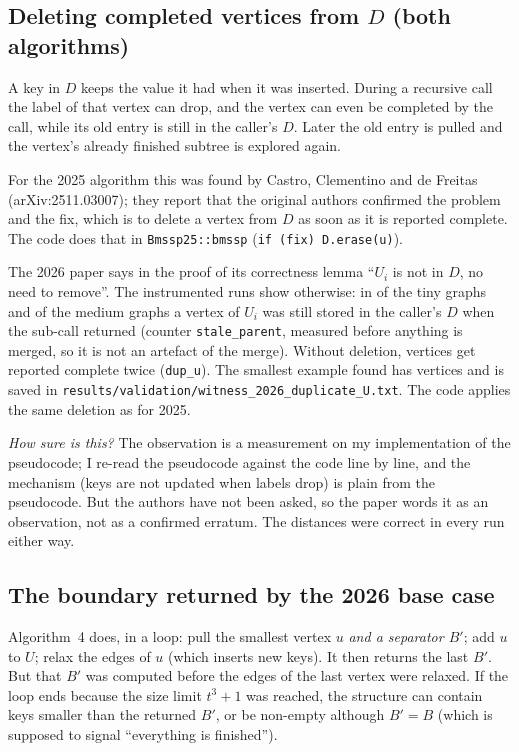 \documentclass[11pt,a4paper]{article}
\newcommand{\code}[1]{\texttt{#1}}
\begin{document}
\subsection{Deleting completed vertices from $D$ (both algorithms)}
A key in $D$ keeps the value it had when it was inserted. During a recursive call the label of that vertex can drop, and the vertex can even be completed by the call, while its old entry is still in the caller's $D$. Later the old entry is pulled and the vertex's already finished subtree is explored again.

For the 2025 algorithm this was found by Castro, Clementino and de Freitas (arXiv:2511.03007); they report that the original authors confirmed the problem and the fix, which is to delete a vertex from $D$ as soon as it is reported complete. The code does that in \code{Bmssp25::bmssp} (\code{if (fix) D.erase(u)}).

The 2026 paper says in the proof of its correctness lemma ``$U_i$ is not in $D$, no need to remove''. The instrumented runs show otherwise: in \ValSmallStaleTwoSix{} of the \ValSmallTrials{} tiny graphs and \ValMediumStaleTwoSix{} of the \ValMediumTrials{} medium graphs a vertex of $U_i$ was still stored in the caller's $D$ when the sub-call returned (counter \code{stale\_parent}, measured before anything is merged, so it is not an artefact of the merge). Without deletion, vertices get reported complete twice (\code{dup\_u}). The smallest example found has \ValMinNDupTwoSix{} vertices and is saved in \code{results/validation/witness\_2026\_duplicate\_U.txt}. The code applies the same deletion as for 2025.

\emph{How sure is this?} The observation is a measurement on my implementation of the pseudocode; I re-read the pseudocode against the code line by line, and the mechanism (keys are not updated when labels drop) is plain from the pseudocode. But the authors have not been asked, so the paper words it as an observation, not as a confirmed erratum. The distances were correct in every run either way.

\subsection{The boundary returned by the 2026 base case}
Algorithm~4 does, in a loop: pull the smallest vertex $u$ \emph{and a separator $B'$}; add $u$ to $U$; relax the edges of $u$ (which inserts new keys). It then returns the last $B'$. But that $B'$ was computed before the edges of the last vertex were relaxed. If the loop ends because the size limit $t^3+1$ was reached, the structure can contain keys smaller than the returned $B'$, or be non-empty although $B'=B$ (which is supposed to signal ``everything is finished'').
\end{document}
